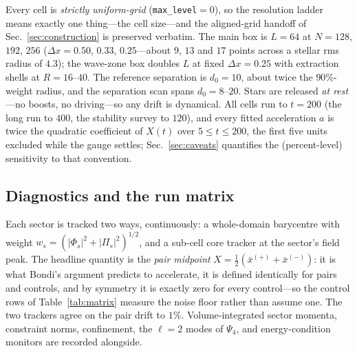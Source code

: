 \documentclass[twocolumn,floatfix,aps,prd,nofootinbib]{revtex4-2}
\begin{document}
Every cell is \emph{strictly uniform-grid} (\texttt{max\_level}${}=0$), so the resolution ladder means exactly one thing---the cell size---and the aligned-grid handoff of Sec.~\ref{sec:construction} is preserved verbatim. The main box is $L=64$ at $N=128$, $192$, $256$ ($\Delta x=0.50$, $0.33$, $0.25$---about $9$, $13$ and $17$ points across a stellar rms radius of $4.3$); the wave-zone box doubles $L$ at fixed $\Delta x=0.25$ with extraction shells at $R=16$--$40$. The reference separation is $d_0=10$, about twice the $90\%$-weight radius, and the separation scan spans $d_0=8$--$20$. Stars are released \emph{at rest}---no boosts, no driving---so any drift is dynamical. All cells run to $t=200$ (the long run to $400$, the stability survey to $120$), and every fitted acceleration $a$ is twice the quadratic coefficient of $X(t)$ over $5\le t\le200$, the first five units excluded while the gauge settles; Sec.~\ref{sec:caveats} quantifies the (percent-level) sensitivity to that convention.

\subsection{Diagnostics and the run matrix}

Each sector is tracked two ways, continuously: a whole-domain barycentre with weight $w_s=(|\Phi_s|^2+|\Pi_s|^2)^{1/2}$, and a sub-cell core tracker at the sector's field peak. The headline quantity is the \emph{pair midpoint} $X=\tfrac12(\bar{x}^{(+)}+\bar{x}^{(-)})$: it is what Bondi's argument predicts to accelerate, it is defined identically for pairs and controls, and by symmetry it is exactly zero for every control---so the control rows of Table~\ref{tab:matrix} measure the noise floor rather than assume one. The two trackers agree on the pair drift to $1\%$. Volume-integrated sector momenta, constraint norms, confinement, the $\ell=2$ modes of $\Psi_4$, and energy-condition monitors are recorded alongside.
\end{document}
